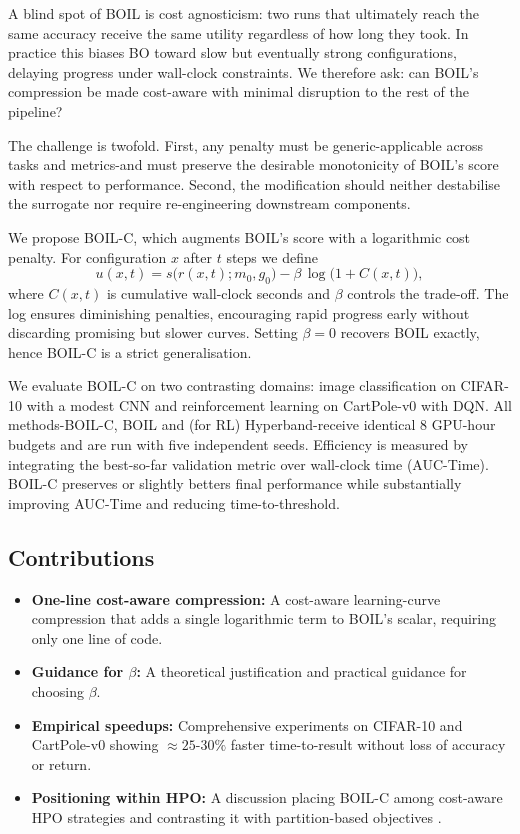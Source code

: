 \documentclass{article} %
\begin{document}
A blind spot of BOIL is cost agnosticism: two runs that ultimately reach the same accuracy receive the same utility regardless of how long they took. In practice this biases BO toward slow but eventually strong configurations, delaying progress under wall-clock constraints. We therefore ask: can BOIL's compression be made cost-aware with minimal disruption to the rest of the pipeline?

The challenge is twofold. First, any penalty must be generic-applicable across tasks and metrics-and must preserve the desirable monotonicity of BOIL's score with respect to performance. Second, the modification should neither destabilise the surrogate nor require re-engineering downstream components.

We propose BOIL-C, which augments BOIL's score with a logarithmic cost penalty. For configuration \(x\) after \(t\) steps we define
\[ u(x,t) = s\bigl(r(x,t); m_0, g_0\bigr) - \beta\,\log\bigl(1 + C(x,t)\bigr), \]
where \(C(x,t)\) is cumulative wall-clock seconds and \(\beta\) controls the trade-off. The log ensures diminishing penalties, encouraging rapid progress early without discarding promising but slower curves. Setting \(\beta=0\) recovers BOIL exactly, hence BOIL-C is a strict generalisation.

We evaluate BOIL-C on two contrasting domains: image classification on CIFAR-10 with a modest CNN and reinforcement learning on CartPole-v0 with DQN. All methods-BOIL-C, BOIL and (for RL) Hyperband-receive identical 8 GPU-hour budgets and are run with five independent seeds. Efficiency is measured by integrating the best-so-far validation metric over wall-clock time (AUC-Time). BOIL-C preserves or slightly betters final performance while substantially improving AUC-Time and reducing time-to-threshold.

\subsection{Contributions}
\begin{itemize}
  \item \textbf{One-line cost-aware compression:} A cost-aware learning-curve compression that adds a single logarithmic term to BOIL's scalar, requiring only one line of code.
  \item \textbf{Guidance for \(\beta\):} A theoretical justification and practical guidance for choosing \(\beta\).
  \item \textbf{Empirical speedups:} Comprehensive experiments on CIFAR-10 and CartPole-v0 showing \(\approx 25\text{-}30\%\) faster time-to-result without loss of accuracy or return.
  \item \textbf{Positioning within HPO:} A discussion placing BOIL-C among cost-aware HPO strategies and contrasting it with partition-based objectives \cite{mlodozeniec-2023-hyperparameter}.
\end{itemize}
\end{document}
